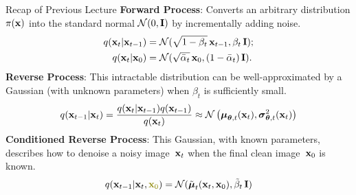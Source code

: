 \documentclass{beamer}
\begin{document}
\begin{frame}
\titlepage
\end{frame}
\begin{frame}{Recap of Previous Lecture}
	\textbf{Forward Process}: Converts an arbitrary distribution $\pi(\mathbf{x})$ into the standard normal $\mathcal{N}(0, \mathbf{I})$ by incrementally adding noise.
	\begin{align*}
		q(\mathbf{x}_t | \mathbf{x}_{t-1}) &= \mathcal{N}(\sqrt{1 - \beta_t}\, \mathbf{x}_{t-1}, \beta_t\, \mathbf{I}); \\
		q(\mathbf{x}_t | \mathbf{x}_0) &= \mathcal{N}(\sqrt{\bar{\alpha}_t}\, \mathbf{x}_0, (1 - \bar{\alpha}_t)\, \mathbf{I}).
	\end{align*}
	\textbf{Reverse Process}: This intractable distribution can be well-approximated by a Gaussian (with unknown parameters) when $\beta_t$ is sufficiently small.
	\[
		q(\mathbf{x}_{t-1}|\mathbf{x}_{t}) = \frac{q(\mathbf{x}_{t}|\mathbf{x}_{t-1}) q(\mathbf{x}_{t-1})}{q(\mathbf{x}_{t})} \approx \mathcal{N} \left(\boldsymbol{\mu}_{\boldsymbol{\theta}, t}(\mathbf{x}_t), \boldsymbol{\sigma}_{\boldsymbol{\theta}, t}^2(\mathbf{x}_t)\right)
	\]
	\textbf{Conditioned Reverse Process}: This Gaussian, with known parameters, describes how to denoise a noisy image~$\mathbf{x}_t$ when the final clean image~$\mathbf{x}_0$ is known.
	\[
		q(\bx_{t-1}|\bx_{t}, {\color{olive}\bx_0}) = \cN(\tilde{\bmu}_t(\bx_t, \bx_0), \tilde{\beta}_t\, \bI)
	\]
\end{frame}
\end{document}
